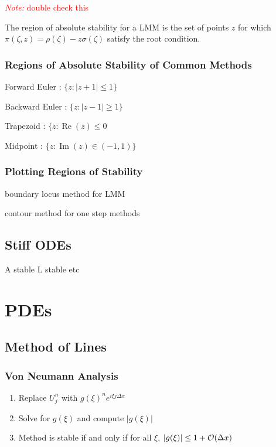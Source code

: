 \documentclass[12pt]{article}
\newcommand{\note}[1]{\textcolor{red}{\textit{Note:} #1}}
\begin{document}
\note{double check this}

The region of absolute stability for a LMM is the set of points \( z \) for which \( \pi(\zeta,z) = \rho(\zeta) - z \sigma(\zeta) \) satisfy the root condition.


\subsubsection{Regions of Absolute Stability of Common Methods}

Forward Euler : \( \{z : |z+1|\leq 1 \} \)

Backward Euler : \( \{ z : |z-1| \geq 1 \} \)

Trapezoid : \( \{ z : \operatorname{Re}(z) \leq 0 \)

Midpoint : \( \{ z : \operatorname{Im}(z) \in (-1,1) \} \)


\subsubsection{Plotting Regions of Stability}

boundary locus method for LMM

contour method for one step methods

\subsection{Stiff ODEs}

A stable L stable etc

\section{PDEs}
\subsection{Method of Lines}

\subsubsection{Von Neumann Analysis}

\begin{enumerate}[nolistsep]
    \item Replace \( U_j^n \) with \( g(\xi)^n e^{i\xi j \Delta x} \)
    \item Solve for \( g(\xi) \) and compute \( |g(\xi)| \)
    \item Method is stable if and only if for all \( \xi \), \( |g(\xi)| \leq 1+\mathcal{O}(\Delta x) \)
\end{enumerate}
\end{document}
